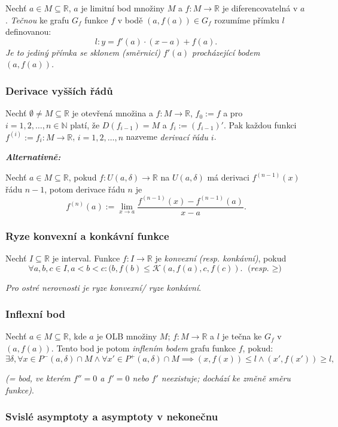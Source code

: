\documentclass[10pt,a4paper]{article}
\newcommand{\N}{{\mathbb{N}}}
\newcommand{\R}{{\mathbb{R}}}
\begin{document}
Nechť $a\in M \subseteq \R$, $a$ je limitní bod množiny $M$ a $f: M\to \R$ je diferencovatelná v $a$. 
\textit{Tečnou} ke grafu $G_f$ funkce $f$ v bodě $(a, f(a))\in G_f$ rozumíme přímku $l$ definovanou: $$l:y=f'(a)\cdot (x-a) + f(a).$$
\textit{Je to jediný přímka se sklonem (směrnicí) $f'(a)$ procházející bodem $(a, f(a))$.}

\subsubsection{Derivace vyšších řádů}

Nechť $\emptyset \neq M \subseteq \R$ je otevřená množina a $f:M\to \R$, $f_0 := f$ a pro $i = 1, 2, \dots, n \in \N$ platí, že $D(f_{i-1}) = M$ a $f_i:= (f_{i-1})'$. Pak každou funkci $f^{(i)}:= f_i:M\to \R$, $i=1,2,\dots,n$ nazveme \textit{derivací řádu $i$}.

\textit{\textbf{Alternativně:}}

Nechť $a \in M \subseteq \R$, pokud $f:U(a, \delta) \to \R$ na $U(a, \delta)$ má derivaci $f^{(n-1)}(x)$ řádu $n-1$, potom derivace řádu $n$ je 
$$f^{(n)}(a):= \lim_{x\to a}\frac{f^{(n-1)}(x) - f^{(n-1)}(a)}{x-a}.$$

\subsubsection{Ryze konvexní a konkávní funkce}
Nechť $I \subseteq \R$ je interval. Funkce $f:I\to \R$ je \textit{konvexní (resp. konkávní)}, pokud
\[
    \forall a,b,c \in I, a < b< c: (b, f(b) \leq \mathcal{K} (a, f(a), c, f(c)). \textit{ (resp. $\geq$)}
\]

\textit{Pro ostré nerovnosti je ryze konvexní/ ryze konkávní}.

\subsubsection{Inflexní bod}

Nechť $a \in M \subseteq \R$, kde $a$ je OLB množiny $M$; $f:M\to \R$ a $l$ je tečna ke $G_f$ v $(a, f(a))$. 
Tento bod je potom \textit{inflením bodem} grafu funkce $f$, pokud:
\[
    \exists \delta, \forall x\in P^{-}(a, \delta) \cap M \land \forall x'\in P^{+}(a, \delta) \cap M \implies (x, f(x)) \leq l \land (x', f(x')) \geq l,
\] 

\textit{(= bod, ve kterém $f''=0$ a $f'=0$ nebo $f'$ neexistuje; dochází ke změně směru funkce)}.

\subsubsection{Svislé asymptoty a asymptoty v nekonečnu}
\end{document}

